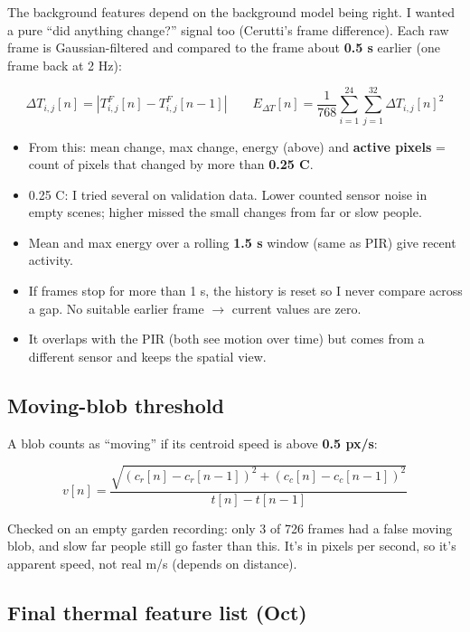\documentclass[11pt,a4paper]{article}
\providecommand{\tightlist}{\setlength{\itemsep}{0pt}\setlength{\parskip}{0pt}}
\begin{document}
The background features depend
on the background model being
right. I wanted a pure ``did
anything change?'' signal too
(Cerutti's frame difference).
Each raw frame is
Gaussian-filtered and compared
to the frame about \textbf{0.5
s} earlier (one frame back at
2 Hz):

\[
\Delta T_{i,j}[n] = |T^{F}_{i,j}[n] - T^{F}_{i,j}[n-1]| \qquad E_{\Delta T}[n] = \frac{1}{768}\sum_{i=1}^{24}\sum_{j=1}^{32}\Delta T_{i,j}[n]^2
\]

\begin{itemize}
\tightlist
\item
  From this: mean change, max
  change, energy (above) and
  \textbf{active pixels} =
  count of pixels that changed
  by more than \textbf{0.25
  \textdegree{}C}.
\item
  0.25 \textdegree{}C: I tried several on
  validation data. Lower
  counted sensor noise in
  empty scenes; higher missed
  the small changes from far
  or slow people.
\item
  Mean and max energy over a
  rolling \textbf{1.5 s}
  window (same as PIR) give
  recent activity.
\item
  If frames stop for more than
  1 s, the history is reset so
  I never compare across a
  gap. No suitable earlier
  frame $\rightarrow$ current values are
  zero.
\item
  It overlaps with the PIR
  (both see motion over time)
  but comes from a different
  sensor and keeps the spatial
  view.
\end{itemize}

\hypertarget{moving-blob-threshold}{%
\subsection{Moving-blob
threshold}\label{moving-blob-threshold}}

A blob counts as ``moving'' if
its centroid speed is above
\textbf{0.5 px/s}:

\[
v[n] = \frac{\sqrt{(c_r[n]-c_r[n-1])^2+(c_c[n]-c_c[n-1])^2}}{t[n]-t[n-1]}
\]

Checked on an empty garden
recording: only 3 of 726
frames had a false moving
blob, and slow far people
still go faster than this.
It's in pixels per second, so
it's apparent speed, not real
m/s (depends on distance).

\hypertarget{final-thermal-feature-list-oct}{%
\subsection{Final thermal
feature list
(Oct)}\label{final-thermal-feature-list-oct}}
\end{document}
